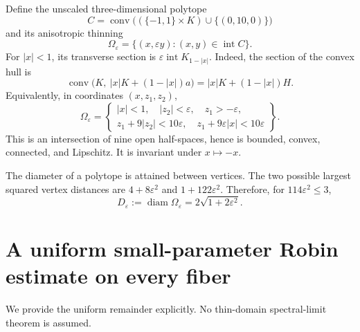 \documentclass[11pt,a4paper]{article}
\theoremstyle{remark}
\newcommand{\eps}{\varepsilon}
\newcommand{\diam}{\operatorname{diam}}
\newcommand{\conv}{\operatorname{conv}}
\begin{document}
Define the unscaled three-dimensional polytope
\[
 C=\conv\bigl((\{-1,1\}\times K)\cup\{(0,10,0)\}\bigr)
\]
and its anisotropic thinning
\begin{equation}\label{eq:domain}
 \Omega_\eps=\{(x,\eps y):(x,y)\in\operatorname{int}C\}.
\end{equation}
For $|x|<1$, its transverse section is $\eps\operatorname{int}K_{1-|x|}$. Indeed, the section of the convex hull is
\[
 \conv\bigl(K,\ |x|K+(1-|x|)a\bigr)
 =|x|K+(1-|x|)H.
\]
Equivalently, in coordinates $(x,z_1,z_2)$,
\begin{equation}\label{eq:halfspaces}
 \Omega_\eps=\left\{
 \begin{array}{l}
 |x|<1,\quad |z_2|<\eps,\quad z_1>-\eps,\\
 z_1+9|z_2|<10\eps,\quad z_1+9\eps|x|<10\eps
 \end{array}\right\}.
\end{equation}
This is an intersection of nine open half-spaces, hence is bounded, convex, connected, and Lipschitz. It is invariant under $x\mapsto-x$.

The diameter of a polytope is attained between vertices. The two possible largest squared vertex distances are $4+8\eps^2$ and $1+122\eps^2$. Therefore, for $114\eps^2\le3$,
\begin{equation}\label{eq:diam}
 D_\eps:=\diam\Omega_\eps=2\sqrt{1+2\eps^2}.
\end{equation}

\section{A uniform small-parameter Robin estimate on every fiber}
We provide the uniform remainder explicitly. No thin-domain spectral-limit theorem is assumed.
\end{document}
